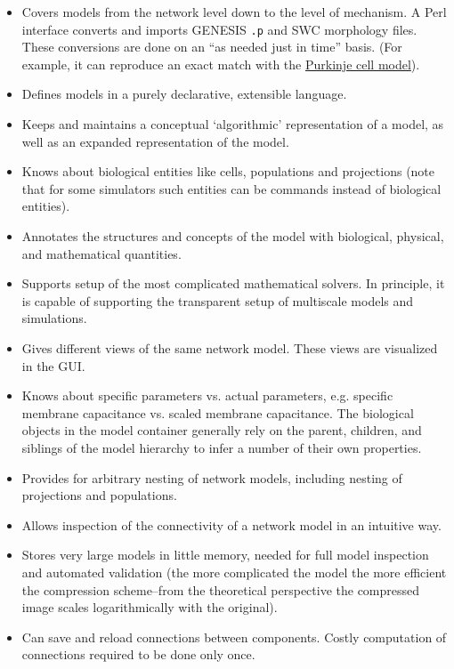 \documentclass[12pt]{article}
\begin{document}
\begin{itemize}

\item Covers models from the network level down to the level of mechanism. A Perl interface converts and imports GENESIS {\tt .p} and SWC morphology files. These conversions are done on an ``as needed just in time'' basis. (For example, it can reproduce an exact match with the \href{../purkinje-cell-model/purkinje-cell-model.pdf}{Purkinje cell model}).

\item Defines models in a purely declarative, extensible language.

\item Keeps and maintains a conceptual `algorithmic' representation of a model, as well as an expanded representation of the model.

\item Knows about biological entities like cells, populations and projections (note that for some simulators such entities can be commands instead of biological entities).

\item Annotates the structures and concepts of the model with biological, physical, and mathematical quantities.

\item Supports setup of the most complicated mathematical solvers. In principle, it is capable of supporting the transparent setup of multiscale models and simulations.

\item Gives different views of the same network model. These views are visualized in the GUI.

\item Knows about specific parameters vs. actual parameters, e.g. specific membrane capacitance vs. scaled membrane capacitance. The biological objects in the model container generally rely on the parent, children, and siblings of the model hierarchy to infer a number of their own properties.

\item Provides for arbitrary nesting of network models, including nesting of projections and populations.

\item Allows inspection of the connectivity of a network model in an intuitive way.

\item Stores very large models in little memory, needed for full model inspection and automated validation (the more complicated the model the more efficient the compression scheme--from the theoretical perspective the compressed image scales logarithmically with the original).

\item Can save and reload connections between components. Costly computation of connections required to be done only once.
    
\end{itemize}
    
\end{document}
